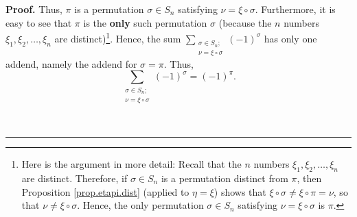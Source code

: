 \documentclass[numbers=enddot,12pt,final,onecolumn,notitlepage,english]{scrartcl}%
\theoremstyle{definition}
\newenvironment{proof}[1][Proof]{\noindent\textbf{#1.} }{\ \rule{0.5em}{0.5em}}
\let\sumnonlimits\sum
\renewcommand{\sum}{\sumnonlimits\limits}
\newenvironment{vershort}{}{}
\begin{document}
\begin{proof}
\begin{vershort}
Thus, $\pi$ is a permutation $\sigma\in S_{n}$ satisfying $\nu=\xi\circ\sigma
$. Furthermore, it is easy to see that $\pi$ is the \textbf{only} such
permutation $\sigma$ (because the $n$ numbers $\xi_{1},\xi_{2},\ldots,\xi_{n}$
are distinct)\footnote{Here is the argument in more detail: Recall that the
$n$ numbers $\xi_{1},\xi_{2},\ldots,\xi_{n}$ are distinct. Therefore, if
$\sigma\in S_{n}$ is a permutation distinct from $\pi$, then Proposition
\ref{prop.etapi.dist} (applied to $\eta=\xi$) shows that $\xi\circ\sigma
\neq\xi\circ\pi=\nu$, so that $\nu\neq\xi\circ\sigma$. Hence, the only
permutation $\sigma\in S_{n}$ satisfying $\nu=\xi\circ\sigma$ is $\pi$.}.
Hence, the sum $\sum_{\substack{\sigma\in S_{n};\\\nu=\xi\circ\sigma}}\left(
-1\right)  ^{\sigma}$ has only one addend, namely the addend for $\sigma=\pi$.
Thus,
\begin{equation}
\sum_{\substack{\sigma\in S_{n};\\\nu=\xi\circ\sigma}}\left(  -1\right)
^{\sigma}=\left(  -1\right)  ^{\pi}. \label{pf.lem.xi-det.c3.short.sum=}%
\end{equation}

\end{vershort}


\end{proof}
\end{document}
